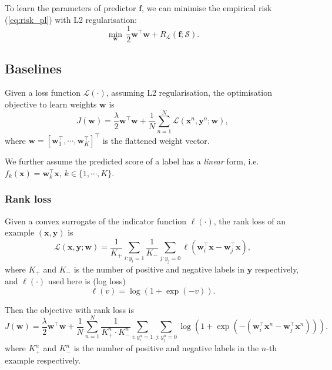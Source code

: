 \documentclass[9pt]{extarticle}
\newcommand{\f}{\mathbf{f}}
\newcommand{\x}{\mathbf{x}}
\newcommand{\y}{\mathbf{y}}
\newcommand{\1}{\mathbf{1}}
\newcommand{\w}{\mathbf{w}}
\newcommand{\LCal}{\mathcal{L}}
\newcommand{\SCal}{\mathcal{S}}
\newcommand{\ie}{i.e.\ }
\begin{document}
To learn the parameters of predictor $\f$, we can minimise the empirical risk (\ref{eq:risk_pl}) with L2 regularisation:
\begin{equation}
\label{eq:minrisk_l2}
\min_{\w} \, \frac{1}{2} \w^\top \w + R_{\LCal}(\f; \SCal).
\end{equation}


\subsection{Baselines}


Given a loss function $\LCal(\cdot)$, assuming L2 regularisation, the optimisation objective to learn weights $\w$ is
\begin{equation}
\label{eq:obj}
J(\w) = \frac{\lambda}{2}\w^\top \w + \frac{1}{N} \sum_{n=1}^N \LCal(\x^n, \y^n; \w),
\end{equation}
where $\w = [\w_1^\top, \cdots, \w_K^\top]^\top$ is the flattened weight vector.

We further assume the predicted score of a label has a \emph{linear} form, \ie $f_k(\x) = \w_k^\top \x, \, k \in \{1,\cdots,K\}$.



\subsubsection{Rank loss}
\label{sssec:rank}

Given a convex surrogate of the indicator function $\ell(\cdot)$, 
the rank loss of an example $(\x, \y)$ is
\begin{equation*}
\LCal(\x, \y; \w) = \frac{1}{K_+} \sum_{i: y_i = 1} \frac{1}{K_-} \sum_{j: y_j = 0} \ell(\w_i^\top \x - \w_j^\top \x),
\end{equation*}
where $K_+$ and $K_-$ is the number of positive and negative labels in $\y$ respectively, 
and $\ell(\cdot)$ used here is (log loss)
\begin{equation*}
\ell(v) = \log(1 + \exp(-v)).
\end{equation*}

Then the objective with rank loss is
\begin{equation}
\label{eq:obj_rank}
J(\w) = \frac{\lambda}{2} \w^\top \w + \frac{1}{N} \sum_{n=1}^N \frac{1}{K_+^n \cdot K_-^n} \sum_{i:y_i^n=1} \sum_{j:y_j^n=0} 
        \log \left( 1 + \exp \left( - \left( \w_i^\top \x^n - \w_j^\top \x^n \right) \right) \right).
\end{equation}
where $K_+^n$ and $K_-^n$ is the number of positive and negative labels in the $n$-th example respectively.
\end{document}
